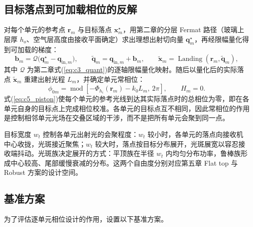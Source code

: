 \subsection{目标落点到可加载相位的反解}

对每个单元的参考点 $\mathbf r_m$ 与目标落点 $\mathbf x_m^\star$，用第二章的分层 Fermat 路径（玻璃上层厚 $h_o$、空气层高度由接收平面确定）求出理想出射切向量 $\mathbf q_m^\star$，再经限幅量化得到可加载的梯度：
\begin{equation}
\mathbf b_m=\mathcal Q\big(\mathbf q_m^\star-\mathbf q_{\mathrm{in},m}\big),\qquad
\tilde{\mathbf q}_m=\mathbf q_{\mathrm{in},m}+\mathbf b_m,\qquad
\tilde{\mathbf x}_m=\operatorname{Landing}(\mathbf r_m,\tilde{\mathbf q}_m),
\label{eq:c5_inverse}
\end{equation}
其中 $\mathcal Q$ 为第二章式(\ref{eq:c3_quant})的逐轴限幅量化映射。随后以量化后的实际落点 $\tilde{\mathbf x}_m$ 重建出射光程 $L_m$，并确定单元常相位：
\begin{equation}
\phi_{0m}=\operatorname{mod}\!\left[-\Phi_{h_i}(\mathbf r_m)-k_0L_m,\ 2\pi\right],\qquad H_m=0.
\label{eq:c5_piston}
\end{equation}
式(\ref{eq:c5_piston})使每个单元的参考光线到达其实际落点时的总相位为零，即在各单元自身的目标点上完成相位校准。各单元的目标点互不相同，因此常相位的作用是控制相邻单元光场在交叠区域的干涉，而不是把所有单元会聚到同一点。

目标宽度 $w_t$ 控制各单元出射光的会聚程度：$w_t$ 较小时，各单元的落点向接收机中心收拢，光斑接近聚焦；$w_t$ 较大时，落点按目标分布展开，光斑展宽以容忍接收端抖动。光斑族决定展开的方式：平顶族在半径 $w_t$ 内均匀分布功率，鲁棒族形成中心较高、尾部缓慢衰减的分布。这两个自由度分别对应第五章 Flat top 与 Robust 方案的设计空间。

\subsection{基准方案}

为了评估逐单元相位设计的作用，设置以下基准方案。

